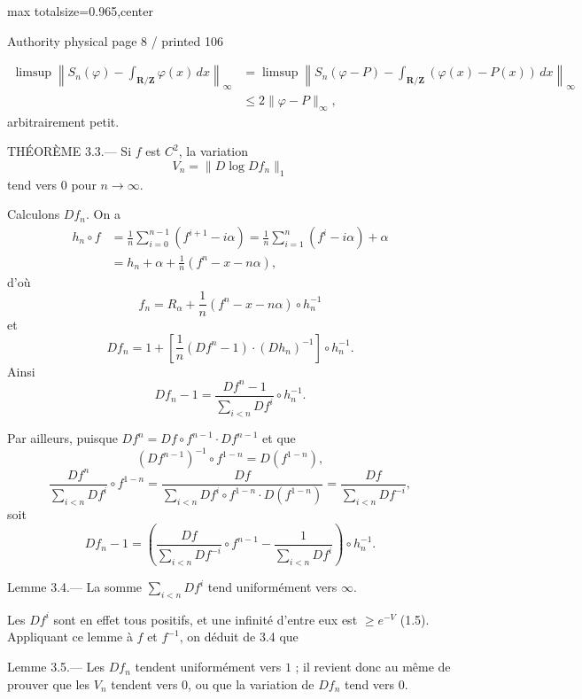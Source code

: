 \documentclass{article}
\begin{document}
\newpage
\noindent\begin{adjustbox}{max totalsize={\textwidth}{0.965\textheight},center}\begin{minipage}{\textwidth}
\noindent\hfill\scriptsize Authority physical page 8 / printed 106\par\normalsize
\[
\begin{aligned}
\limsup\left\|S_n(\varphi)-\int_{\mathbf R/\mathbf Z}\varphi(x)\,dx\right\|_\infty
&=\limsup\left\|S_n(\varphi-P)-\int_{\mathbf R/\mathbf Z}(\varphi(x)-P(x))\,dx\right\|_\infty\\
&\leq2\|\varphi-P\|_\infty,
\end{aligned}
\]
arbitrairement petit.

THÉORÈME 3.3.— Si \(f\) est \(C^2\), la variation
\[
V_n=\|D\log Df_n\|_1
\]
tend vers \(0\) pour \(n\to\infty\).

Calculons \(Df_n\). On a
\[
\begin{aligned}
h_n\circ f
&=\frac1n\sum_{i=0}^{n-1}(f^{i+1}-i\alpha)
=\frac1n\sum_{i=1}^{n}(f^i-i\alpha)+\alpha\\
&=h_n+\alpha+\frac1n(f^n-x-n\alpha),
\end{aligned}
\]
d’où
\[
f_n=R_\alpha+\frac1n(f^n-x-n\alpha)\circ h_n^{-1}
\]
et
\[
Df_n=1+\left[\frac1n(Df^n-1)\cdot(Dh_n)^{-1}\right]\circ h_n^{-1}.
\]
Ainsi
\[
Df_n-1=\frac{Df^n-1}{\sum_{i<n}Df^i}\circ h_n^{-1}.
\]

Par ailleurs, puisque \(Df^n=Df\circ f^{n-1}\cdot Df^{n-1}\) et que
\[
(Df^{n-1})^{-1}\circ f^{1-n}=D(f^{1-n}),
\]
\[
\frac{Df^n}{\sum_{i<n}Df^i}\circ f^{1-n}
=\frac{Df}{\sum_{i<n}Df^i\circ f^{1-n}\cdot D(f^{1-n})}
=\frac{Df}{\sum_{i<n}Df^{-i}},
\]
soit
\[
\tag{3.3.1}
Df_n-1=\left(\frac{Df}{\sum_{i<n}Df^{-i}}\circ f^{n-1}-\frac1{\sum_{i<n}Df^i}\right)\circ h_n^{-1}.
\]

Lemme 3.4.— La somme \(\sum_{i<n}Df^i\) tend uniformément vers \(\infty\).

Les \(Df^i\) sont en effet tous positifs, et une infinité d’entre eux est \(\geq e^{-V}\) (1.5). Appliquant ce lemme à \(f\) et \(f^{-1}\), on déduit de 3.4 que

Lemme 3.5.— Les \(Df_n\) tendent uniformément vers \(1\) ; il revient donc au même de prouver que les \(V_n\) tendent vers \(0\), ou que la variation de \(Df_n\) tend vers \(0\).
\end{minipage}\end{adjustbox}
\end{document}
